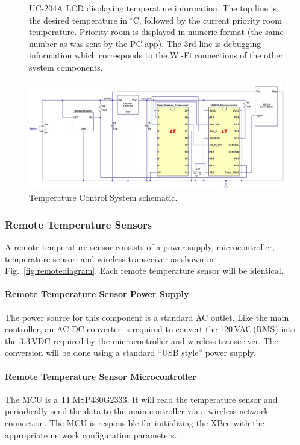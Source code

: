 \begin{figure}
\caption{UC-204A LCD displaying temperature information.  The top line is the desired temperature in $^\circ$C, followed by the current priority room temperature.  Priority room is displayed in numeric format (the same number as was sent by the PC app).  The 3rd line is debugging information which corresponds to the Wi-Fi connections of the other system components. }
\label{fig:lcd_sample}
\end{figure}




\begin{figure} [htb]
\centering
\includegraphics[width=.99\textwidth]{Temperature_Sensor.jpg}
\caption{Temperature Control System schematic.}
\label{fig:Temperature_System}
\end{figure}


\subsubsection{Remote Temperature Sensors}
A remote temperature sensor consists of a power supply, microcontroller, temperature sensor, and wireless transceiver as shown in Fig.~\ref{fig:remotediagram}.  Each remote temperature sensor will be identical.

\paragraph{Remote Temperature Sensor Power Supply}
The power source for this component is a standard AC outlet.  Like the main controller, an AC-DC converter is required to convert the 120\,VAC\,(RMS) into the 3.3\,VDC required by the microcontroller and wireless transceiver.  The conversion will be done using a standard ``USB style'' power supply.
\paragraph{Remote Temperature Sensor Microcontroller}
The MCU is a TI MSP430G2333.  It will read the temperature  sensor and periodically send the data to the main controller via a wireless network connection.  The MCU is responsible for initializing the XBee with the appropriate network configuration parameters.
